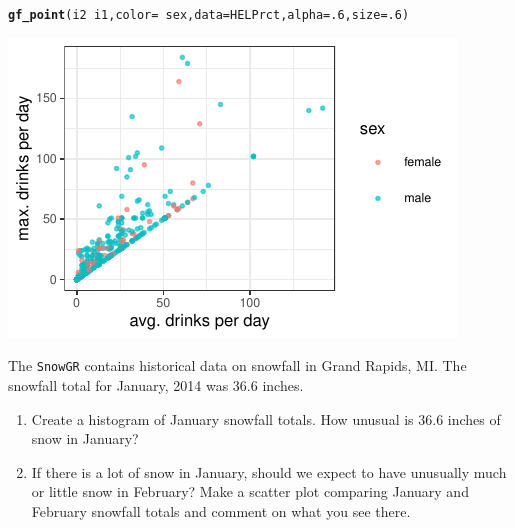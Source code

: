 \documentclass[twoside]{book}\usepackage[]{graphicx}\usepackage[]{xcolor}
\makeatletter
\def\maxwidth{ %
  \ifdim\Gin@nat@width>\linewidth
    \linewidth
  \else
    \Gin@nat@width
  \fi
}
\newcommand{\hlnum}[1]{\textcolor[rgb]{0.686,0.059,0.569}{#1}}%
\newcommand{\hlopt}[1]{\textcolor[rgb]{0,0,0}{#1}}%
\newcommand{\hlstd}[1]{\textcolor[rgb]{0.345,0.345,0.345}{#1}}%
\newcommand{\hlkwc}[1]{\textcolor[rgb]{0.333,0.667,0.333}{#1}}%
\newcommand{\hlkwd}[1]{\textcolor[rgb]{0.737,0.353,0.396}{\textbf{#1}}}%
\newenvironment{kframe}{%
 \def\at@end@of@kframe{}%
 \ifinner\ifhmode%
  \def\at@end@of@kframe{\end{minipage}}%
  \begin{minipage}{\columnwidth}%
 \fi\fi%
 \def\FrameCommand##1{\hskip\@totalleftmargin \hskip-\fboxsep
 \colorbox{shadecolor}{##1}\hskip-\fboxsep
     \hskip-\linewidth \hskip-\@totalleftmargin \hskip\columnwidth}%
 \MakeFramed {\advance\hsize-\width
   \@totalleftmargin\z@ \linewidth\hsize
   \@setminipage}}%
 {\par\unskip\endMakeFramed%
 \at@end@of@kframe}
\newenvironment{knitrout}{}{} %
\newcommand{\Rindex}[1]{\index{\texttt{#1}}}
\newcommand{\dataframe}[1]{{\color{blue!80!black}\texttt{#1}}\Rindex{#1}}
\makeatother
\begin{document}
\begin{solution}
\begin{knitrout}
\end{knitrout}
\begin{knitrout}
\color{fgcolor}\begin{kframe}
\begin{alltt}
\hlkwd{gf_point}\hlstd{( i2} \hlopt{~} \hlstd{i1,} \hlkwc{color} \hlstd{=} \hlopt{~} \hlstd{sex,} \hlkwc{data} \hlstd{=  HELPrct,} \hlkwc{alpha} \hlstd{=} \hlnum{.6}\hlstd{,} \hlkwc{size} \hlstd{=} \hlnum{.6} \hlstd{)}
\end{alltt}
\end{kframe}

{\centering \includegraphics[width=\maxwidth]{figures/fig-unnamed-chunk-29-1} 

}



\end{knitrout}
\end{solution}

\begin{problem}
	The \dataframe{SnowGR} contains historical data on snowfall in Grand Rapids, MI.
	The snowfall total for January, 2014 was 36.6 inches.
	\begin{enumerate}
		\item
			Create a histogram of January snowfall totals.  How unusual is 36.6 inches of 
			snow in January?
		\item
			If there is a lot of snow in January, should we expect to have unusually much
			or little snow in February?  Make a scatter plot comparing January and February
			snowfall totals and comment on what you see there.
	\end{enumerate}
\end{problem}
\end{document}

